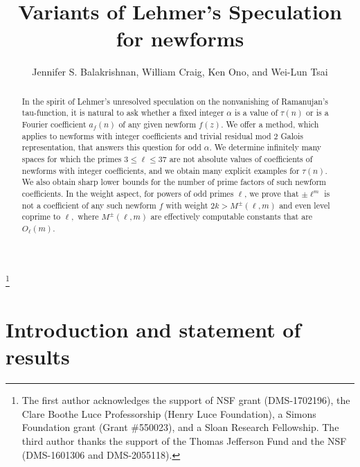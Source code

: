 \documentclass[12pt]{amsart}
\newcommand{\?}{\color{red}?}
\numberwithin{equation}{section}
\begin{document}
\title[Variants of Lehmer's speculation for newforms]{Variants of Lehmer's Speculation for newforms}
\author{Jennifer S. Balakrishnan, William Craig,  Ken Ono, and Wei-Lun Tsai}
\address{Department of Mathematics and Statistics, Boston University,
Boston, MA 02215}

\address{Mathematical Institute,
University of Cologne, 
Cologne, Germany 50931}

\address{Department of Mathematics, University of Virginia, Charlottesville, VA 22904}


\thanks{The first author acknowledges the support of NSF grant (DMS-1702196), the Clare Boothe Luce Professorship
(Henry Luce Foundation), a Simons Foundation grant (Grant \#550023), and a Sloan
Research Fellowship. The third author thanks the support of the Thomas Jefferson Fund and the NSF
(DMS-1601306 and DMS-2055118).}

\begin{abstract} In the spirit of 
Lehmer's unresolved speculation on the nonvanishing of Ramanujan's tau-function,
it is natural to ask whether a fixed integer $\alpha$ is a value of $\tau(n)$ or is a
Fourier coefficient $a_f(n)$ of any given newform $f(z)$. We offer a method, which applies to newforms with integer coefficients and trivial residual mod 2 Galois representation, that answers this question for odd $\alpha$.
We determine infinitely many spaces for which the primes $3\leq \ell\leq 37$  are not  absolute values of coefficients of newforms with integer coefficients, and we obtain many explicit examples for $\tau(n)$.
We also obtain sharp lower bounds for the number of prime factors of such newform coefficients. 
 In the weight aspect, for powers of odd primes $\ell$, we prove that 
$\pm \ell^m$ is not a coefficient
of any such newform  $f$ with weight $2k>M^{\pm}(\ell,m)$ and even level coprime to $\ell,$ where $M^{\pm}(\ell,m)$ are effectively computable constants that are $O_{\ell}(m).$
\end{abstract}
\maketitle
\section{Introduction and statement of results}
\end{document}
